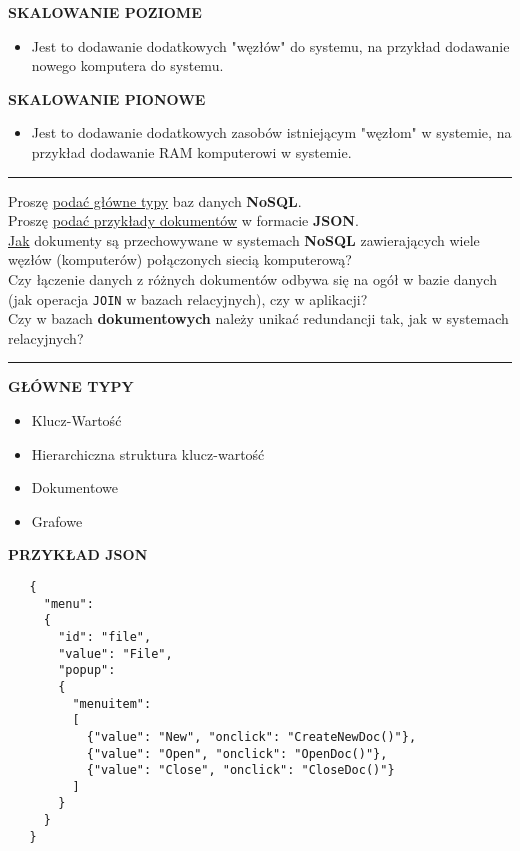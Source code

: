 \documentclass[a5paper,6pt]{article}
\newcommand{\horrule}[1]{\rule{\linewidth}{#1}}
\begin{document}
    \textbf{SKALOWANIE POZIOME}
    \begin{itemize}
        \item Jest to dodawanie dodatkowych "węzłów" do systemu, na przykład
              dodawanie nowego komputera do systemu.
    \end{itemize}

    \textbf{SKALOWANIE PIONOWE}
    \begin{itemize}
        \item Jest to dodawanie dodatkowych zasobów istniejącym "węzłom" w
        systemie, na przykład dodawanie RAM komputerowi w systemie.
    \end{itemize}

    \horrule{0.5pt}
    Proszę \underline{podać główne typy} baz danych \textbf{NoSQL}.\\
    Proszę \underline{podać przykłady dokumentów} w formacie \textbf{JSON}.\\
    \underline{Jak} dokumenty są przechowywane w systemach \textbf{NoSQL}
    zawierających wiele węzłów (komputerów) połączonych siecią komputerową?\\
    Czy łączenie danych z różnych dokumentów odbywa się na ogół w bazie danych
    (jak operacja \texttt{JOIN} w bazach relacyjnych), czy w aplikacji?\\
    Czy w bazach \textbf{dokumentowych} należy unikać redundancji tak, jak w
    systemach relacyjnych?\\
    \horrule{0.5pt}

    \textbf{GŁÓWNE TYPY}
    \begin{itemize}
        \item Klucz-Wartość
        \item Hierarchiczna struktura klucz-wartość
        \item Dokumentowe
        \item Grafowe
    \end{itemize}

    \textbf{PRZYKŁAD JSON}
    \begin{verbatim}
   {
     "menu":
     {
       "id": "file",
       "value": "File",
       "popup":
       {
         "menuitem":
         [
           {"value": "New", "onclick": "CreateNewDoc()"},
           {"value": "Open", "onclick": "OpenDoc()"},
           {"value": "Close", "onclick": "CloseDoc()"}
         ]
       }
     }
   }
    \end{verbatim}
\end{document}
